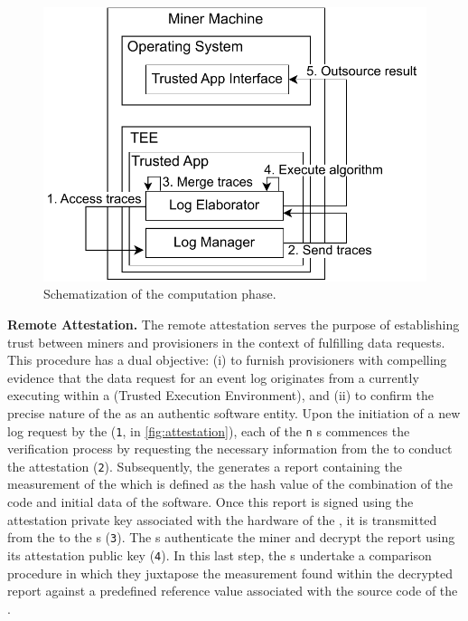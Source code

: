 \begin{figure}
	\vspace{-2em}
	\centering
	\includegraphics[width=1\textwidth]{content/figures/computationworkflow.pdf}
	\caption[A gull]{Schematization of the computation phase.}
	\vspace{-6pt}
	\label{fig:workflow2}
\end{figure}
\textbf{Remote Attestation.} The remote attestation serves the purpose of establishing trust between miners and provisioners in the context of fulfilling data requests. This procedure has a dual objective: (i) to furnish provisioners with compelling evidence that the data request for an event log originates from a  currently executing within a  (Trusted Execution Environment), and (ii) to confirm the precise nature of the  as an authentic  software entity. Upon the initiation of a new log request by the  (\texttt{1}, in \cref{fig:attestation}), each of the \texttt{n} s commences the verification process by requesting the necessary information from the  to conduct the attestation (\texttt{2}). Subsequently, the  generates a report containing the measurement of the  which is defined as the hash value of the combination of the code and initial data of the software. Once this report is signed using the attestation private key associated with the hardware of the , it is transmitted from the  to the s (\texttt{3}). The s authenticate the miner and decrypt the report using its attestation public key (\texttt{4}). In this last step, the s undertake a comparison procedure in which they juxtapose the measurement found within the decrypted report against a predefined reference value associated with the source code of the .

